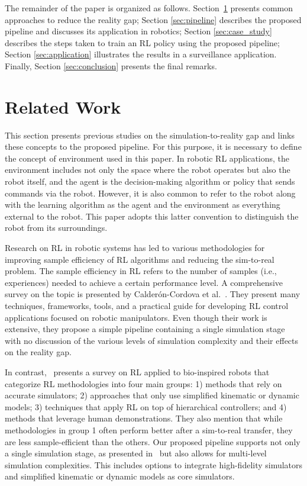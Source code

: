 The remainder of the paper is organized as follows. Section~\ref{sec:related} presents common approaches to reduce the reality gap; Section \ref{sec:pipeline} describes the proposed pipeline and discusses its application in robotics; Section \ref{sec:case_study} describes the steps taken to train an RL policy using the proposed pipeline; Section \ref{sec:application} illustrates the results in a surveillance application. Finally, Section \ref{sec:conclusion} presents the final remarks.

\section{Related Work}
\label{sec:related}

This section presents previous studies on the simulation-to-reality gap and links these concepts to the proposed pipeline. For this purpose, it is necessary to define the concept of environment used in this paper. In robotic RL applications, the environment includes not only the space where the robot operates but also the robot itself, and the agent is the decision-making algorithm or policy that sends commands via the robot.  However, it is also common to refer to the robot along with the learning algorithm as the agent and the environment as everything external to the robot. This paper adopts this latter convention to distinguish the robot from its surroundings.

Research on RL in robotic systems has led to various methodologies for improving sample efficiency of RL algorithms and reducing the sim-to-real problem. The sample efficiency in RL refers to the number of samples (i.e., experiences) needed to achieve a certain performance level. A comprehensive survey on the topic is presented by Calderón-Cordova et al.~\cite{calderon2024deep}. They present many techniques, frameworks, tools, and a practical guide for developing RL control applications focused on robotic manipulators. Even though their work is extensive, they propose a simple pipeline containing a single simulation stage with no discussion of the various levels of simulation complexity and their effects on the reality gap. 

In contrast,~\cite{zhu2021survey} presents a survey on RL applied to bio-inspired robots that categorize RL methodologies into four main groups: 1) methods that rely on accurate simulators; 2) approaches that only use simplified kinematic or dynamic models; 3) techniques that apply RL on top of hierarchical controllers; and 4) methods that leverage human demonstrations. They also mention that while methodologies in group 1 often perform better after a sim-to-real transfer, they are less sample-efficient than the others. Our proposed pipeline supports not only a single simulation stage, as presented in~\cite{calderon2024deep} but also allows for multi-level simulation complexities. This includes options to integrate high-fidelity simulators and simplified kinematic or dynamic models as core simulators.

